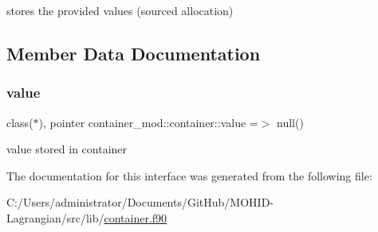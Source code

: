 stores the provided values (sourced allocation) 



\subsection{Member Data Documentation}
\mbox{\label{structcontainer__mod_1_1container_a297f4632156bf226aa8599a7f0cd55c0}} 
\subsubsection{\texorpdfstring{value}{value}}
{\footnotesize\ttfamily class($\ast$), pointer container\+\_\+mod\+::container\+::value =$>$ null()\hspace{0.3cm}{\ttfamily [private]}}



value stored in container 



The documentation for this interface was generated from the following file\+:\begin{DoxyCompactItemize}
\item 
C\+:/\+Users/administrator/\+Documents/\+Git\+Hub/\+M\+O\+H\+I\+D-\/\+Lagrangian/src/lib/\hyperlink{container_8f90}{container.\+f90}\end{DoxyCompactItemize}
